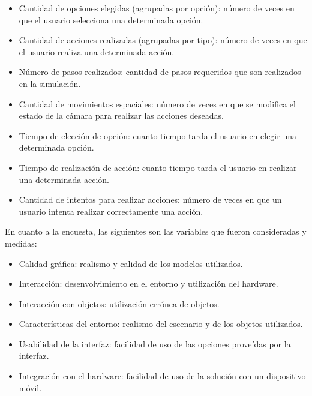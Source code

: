 \begin{itemize}

\item Cantidad de opciones elegidas (agrupadas por opción): número de veces en
    que el usuario selecciona una determinada opción.

\item Cantidad de acciones realizadas (agrupadas por tipo): número de veces  en
    que el usuario realiza una determinada acción.

\item Número de pasos realizados: cantidad de pasos requeridos que son
    realizados en la simulación. 

\item Cantidad de movimientos espaciales: número de veces en que se modifica el
    estado de la cámara para realizar las acciones deseadas.

\item Tiempo de elección de opción: cuanto tiempo tarda el usuario en elegir una
    determinada opción.

\item Tiempo de realización de acción: cuanto tiempo tarda el usuario en
    realizar una determinada acción.

\item Cantidad de intentos para realizar acciones: número de veces en que un
    usuario intenta realizar correctamente una acción. 

\end{itemize}

En cuanto a la encuesta, las siguientes son las variables que fueron consideradas y medidas:

\begin{itemize}

\item Calidad gráfica: realismo y calidad de los modelos utilizados.

\item Interacción: desenvolvimiento en el entorno y utilización del hardware.

\item Interacción con objetos: utilización errónea de objetos.

\item Características del entorno: realismo del escenario y de los objetos
    utilizados.

\item Usabilidad de la interfaz: facilidad de uso de las opciones proveídas por
    la interfaz.

\item Integración con el hardware: facilidad de uso de la solución con un dispositivo móvil. 

\end{itemize}

